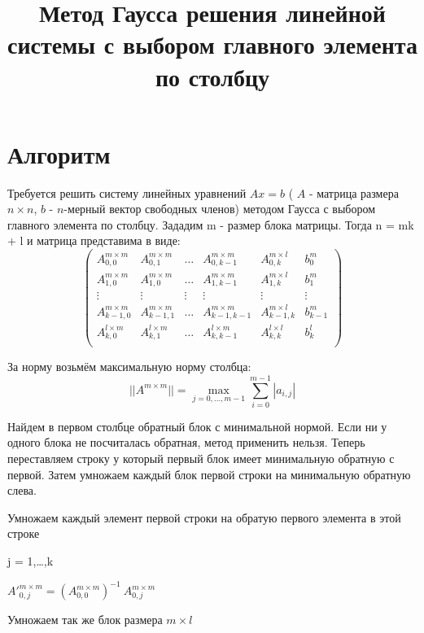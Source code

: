 \documentclass[12pt]{scrreprt}
\begin{document}
\title{Метод Гаусса решения линейной системы с выбором главного элемента по столбцу}
\maketitle

\chapter{Алгоритм}

Требуется решить систему линейных уравнений \( Ax=b \) ( \( A \) - матрица размера \( n\times n \), \(b\) - \(n\)-мерный вектор свободных членов) методом Гаусса с выбором главного элемента по столбцу. Зададим m - размер блока матрицы. Тогда n = mk + l и матрица представима в виде:
\[ \left( \begin{matrix}
{A_{0, 0}^{m \times m}} & {A_{0, 1}^{m \times m}} & {\dots} & {A_{0, k-1}^{m \times m}} & {A_{0, k}^{m \times l}} & {b_{0}^{m}} \\
{A_{1, 0}^{m \times m}} & {A_{1, 0}^{m \times m}} & {\dots} & {A_{1, k-1}^{m \times m}} & {A_{1, k}^{m \times l}} & {b_{1}^{m}} \\
{\vdots} & {\vdots} & {\vdots} & {\vdots} & {\vdots} & {\vdots} \\
{A_{k-1, 0}^{m \times m}} & {A_{k-1, 1}^{m \times m}} & {\dots} & {A_{k-1, k-1}^{m \times m}} & {A_{k-1, k}^{m \times l}} & {b_{k-1}^{m}} \\
{A_{k,0}^{l \times m}} & {A_{k,1}^{l \times m}} & {\dots} & {A_{k, k-1}^{l \times m}} & {A_{k, k}^{l \times l}} & {b_{k}^{l}}\\
\end{matrix}\right) \]

За норму возьмём максимальную норму столбца:
$$||A^{m \times m}|| = \max \limits_{j=0, \ldots, m-1} \sum_{i=0}^{m-1} |a_{i,j}| $$

Найдем в первом столбце обратный блок с минимальной нормой. Если ни у одного блока не посчиталась обратная, метод применить нельзя.
Теперь переставляем строку у который первый блок имеет минимальную обратную с первой. Затем умножаем каждый блок первой строки на минимальную обратную слева.


Умножаем каждый элемент первой строки на обратую первого элемента в этой строке

j = 1,\ldots,k

${A'}_{0, j}^{m \times m} = (A_{0, 0}^{m \times m})^{-1} \ A_{0, j}^{m \times m}$

Умножаем так же блок размера $m \times l$
\end{document}
